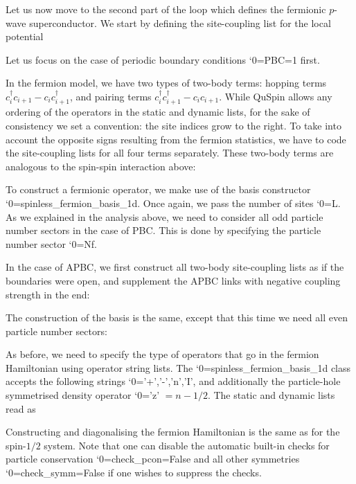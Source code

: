 \documentclass{SciPost}
\newcommand\0{\scalebox{-1}[1]{0}}
\let\svttfamily\ttfamily
\renewcommand\ttfamily{\svttfamily\catcode`0=\active }
\renewcommand\texttt{\bgroup\ttfamily\texttthelp}
\def\texttthelp#1{#1\egroup}
\newcommand{\JWcode}{example4.py}
\begin{document}
Let us now move to the second part of the loop which defines the fermionic $p$-wave superconductor. We start by defining the site-coupling list for the local potential

Let us focus on the case of periodic boundary conditions \texttt{PBC=1} first. 

In the fermion model, we have two types of two-body terms: hopping terms $c^\dagger_{i}c_{i+1} - c_{i}c^\dagger_{i+1}$, and pairing terms $c^\dagger_{i}c^\dagger_{i+1} - c_{i}c_{i+1}$. While QuSpin allows any ordering of the operators in the static and dynamic lists, for the sake of consistency we set a convention: the site indices grow to the right. To take into account the opposite signs resulting from the fermion statistics, we have to code the site-coupling lists for all four terms separately. These two-body terms are analogous to the spin-spin interaction above:

To construct a fermionic operator, we make use of the basis constructor \texttt{spinless\_fermion\_basis\_1d}. Once again, we pass the number of sites \texttt{L}. As we explained in the analysis above, we need to consider all odd particle number sectors in the case of PBC. This is done by specifying the particle number sector \texttt{Nf}. 


In the case of APBC, we first construct all two-body site-coupling lists as if the boundaries were open, and supplement the APBC links with negative coupling strength in the end:

The construction of the basis is the same, except that this time we need all even particle number sectors:


As before, we need to specify the type of operators that go in the fermion Hamiltonian using operator string lists. The \texttt{spinless\_fermion\_basis\_1d} class accepts the following strings \texttt{'+','-','n','I'}, and additionally the particle-hole symmetrised density operator \texttt{'z'} $=n-1/2$. The static and dynamic lists read as

Constructing and diagonalising the fermion Hamiltonian is the same as for the spin-$1/2$ system. Note that one can disable the automatic built-in checks for particle conservation \texttt{check\_pcon=False} and all other symmetries \texttt{check\_symm=False} if one wishes to suppress the checks. 

\end{document}
